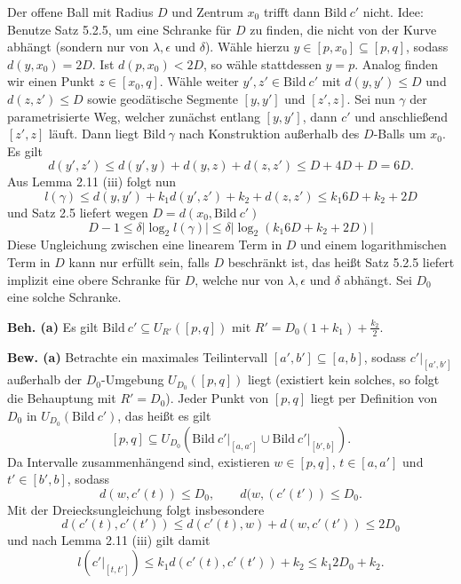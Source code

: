 \documentclass[11pt]{book}
\numberwithin{dummy}{section}
\theoremstyle{nonumberbreak}
\newenvironment{pr}[1][]{\ifthenelse{\equal{#1}{}}{\proof}{\proof[#1]}\rm}{\endproof}
\begin{document}
\begin{spacing}{1.4}
\begin{pr}[\textrm{\textit{Beweis von Satz 2.8}}]
Der offene Ball mit Radius $D$ und Zentrum $x_0$ trifft dann $\mathrm{Bild} \ c'$ nicht. Idee: Benutze Satz 5.2.5, um eine Schranke für $D$ zu finden, die nicht von der Kurve abhängt (sondern nur von $\lambda, \epsilon$ und $\delta$). Wähle hierzu $y \in [p,x_0] \subseteq [p,q]$, sodass $d(y,x_0) =2D$. Ist $d(p,x_0)< 2D$, so wähle stattdessen $y=p$. Analog finden wir einen Punkt $z \in [x_0, q]$. Wähle weiter $y',z' \in \mathrm{Bild} \ c'$ mit $d(y,y') \leqslant D$ und $d(z,z') \leqslant D$ sowie geodätische Segmente $[y,y']$ und $[z',z]$. Sei nun $\gamma$ der parametrisierte Weg, welcher zunächst entlang $[y,y']$, dann $c'$ und anschließend $[z',z]$ läuft. Dann liegt $\mathrm{Bild} \ \gamma$ nach Konstruktion außerhalb des $D$-Balls um $x_0$. Es gilt 
$$d(y',z') \leqslant d(y',y) + d(y,z) + d(z,z') \leqslant D + 4D + D = 6D.$$
Aus Lemma 2.11 (iii) folgt nun 
$$l(\gamma) \leqslant d(y,y') + k_1 d(y',z') + k_2 + d(z,z') \leqslant k_1 6D + k_2 + 2D$$
und Satz 2.5 liefert wegen $D= d(x_0, \mathrm{Bild} \ c')$
$$D-1 \leqslant \delta \vert \log_2 l(\gamma)\vert \leqslant \delta \vert \log_2 (k_1 6D + k_2 + 2D)\vert$$
Diese Ungleichung zwischen eine linearem Term in $D$ und einem logarithmischen Term in $D$ kann nur erfüllt sein, falls $D$ beschränkt ist, das heißt Satz 5.2.5 liefert implizit eine obere Schranke für $D$, welche nur von $\lambda, \epsilon$ und $\delta$ abhängt. Sei $D_0$ eine solche Schranke.
\begin{compactenum}
\item[\textbf{Beh. (a)}] Es gilt $\mathrm{Bild} \ c' \subseteq U_{R'}([p,q])$ mit $R'=D_0(1+k_1) + \frac{k_2}{2}$.
\item[\textbf{Bew. (a)}] 
Betrachte ein maximales Teilintervall $[a',b'] \subseteq [a,b]$, sodass $c'\vert_{[a',b']}$ außerhalb der $D_0$-Umgebung $U_{D_0}([p,q])$ liegt (existiert kein solches, so folgt die Behauptung mit $R'=D_0$). Jeder Punkt von $[p,q]$ liegt per Definition von $D_0$ in $U_{D_0}(\mathrm{Bild} \ c')$, das heißt es gilt 
$$[p,q] \subseteq U_{D_0}\left(\mathrm{Bild} \ c'\vert_{[a,a']}  \cup \mathrm{Bild} \ c'\vert_{[b',b]} \right).$$
Da Intervalle zusammenhängend sind, existieren $w \in [p,q]$, $t \in [a,a']$ und $t' \in [b',b]$, sodass
$$d(w,c'(t)) \leqslant D_0, \qquad d(w,(c'(t')) \leqslant D_0.$$
Mit der Dreiecksungleichung folgt insbesondere
$$d(c'(t), c'(t')) \leqslant d(c'(t), w) + d(w, c'(t')) \leqslant 2D_0$$
und nach Lemma 2.11 (iii) gilt damit
$$l\left( c'\vert_{[t,t']}\right) \leqslant k_1 d(c'(t), c'(t')) + k_2 \leqslant k_1 2D_0 + k_2.$$


\end{compactenum}
\end{pr}
\end{spacing}
\end{document}
